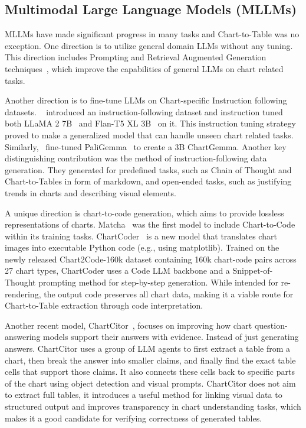 \documentclass[
	letterpaper, %
]{jdf}
\begin{document}
\subsection{Multimodal Large Language Models (MLLMs)}\label{ssect:mllm}
MLLMs have made significant progress in many tasks and Chart-to-Table was no exception.
One direction is to utilize general domain LLMs without any tuning.
This direction includes Prompting and Retrieval Augmented Generation techniques~\cite{cao2024graphinsight, voigt2023vist5}, which improve the capabilities of general LLMs on chart related tasks.

Another direction is to fine-tune LLMs on Chart-specific Instruction following datasets.
~\cite{masry2024chartinstruct} introduced an instruction-following dataset and instruction tuned both LLaMA 2 7B~\cite{touvron2023llama} and Flan-T5 XL 3B~\cite{chung2024scaling} on it.
This instruction tuning strategy proved to make a generalized model that can handle unseen chart related tasks.
Similarly,~\cite{masry2024chartgemma} fine-tuned PaliGemma~\cite{beyer2024paligemma} to create a 3B ChartGemma.
Another key distinguishing contribution was the method of instruction-following data generation.
They generated for predefined tasks, such as Chain of Thought and Chart-to-Tables in form of markdown, and open-ended tasks, such as justifying trends in charts and describing visual elements.

A unique direction is chart-to-code generation, which aims to provide lossless representations of charts.
Matcha~\cite{liu2022matcha} was the first model to include Chart-to-Code within its training tasks.
ChartCoder~\cite{zhao2025chartcoder} is a new model that translates chart images into executable Python code (e.g., using matplotlib).
Trained on the newly released Chart2Code-160k dataset containing 160k chart-code pairs across 27 chart types, ChartCoder uses a Code LLM backbone and a Snippet-of-Thought prompting method for step-by-step generation.
While intended for re-rendering, the output code preserves all chart data, making it a viable route for Chart-to-Table extraction through code interpretation.

Another recent model, ChartCitor~\cite{goswami2025chartcitor}, focuses on improving how chart question-answering models support their answers with evidence. Instead of just generating answers.
ChartCitor uses a group of LLM agents to first extract a table from a chart, then break the answer into smaller claims, and finally find the exact table cells that support those claims.
It also connects these cells back to specific parts of the chart using object detection and visual prompts.
ChartCitor does not aim to extract full tables, it introduces a useful method for linking visual data to structured output and improves transparency in chart understanding tasks, which makes it a good candidate for verifying correctness of generated tables.
\end{document}
